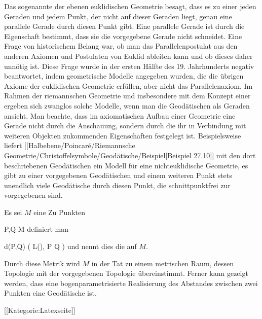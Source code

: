{}
{

Das sogenannte  {}
 {} {}
der ebenen euklidischen Geometrie besagt, dass es zu einer jeden Geraden und jedem Punkt, der nicht auf dieser Geraden liegt, genau eine parallele Gerade durch diesen Punkt gibt. Eine parallele Gerade ist durch die Eigenschaft bestimmt, dass sie die vorgegebene Gerade nicht schneidet. Eine Frage von historischem Belang war, ob man das Parallelenpostulat aus den anderen Axiomen und Postulaten von Euklid ableiten kann und ob dieses daher unnötig ist. Diese Frage wurde in der ersten Hälfte des 19. Jahrhunderts negativ beantwortet, indem geometrische Modelle
 {} {}
angegeben wurden, die die übrigen Axiome der euklidischen Geometrie erfüllen, aber nicht das Parallelenaxiom. Im Rahmen der riemannschen Geometrie und insbesondere mit dem Konzept einer
ergeben sich zwanglos solche Modelle, wenn man die Geodätischen
 {} {}
als Geraden ansieht. Man beachte, dass im axiomatischen Aufbau einer Geometrie eine Gerade nicht durch die Anschauung, sondern durch die ihr in Verbindung mit weiteren Objekten zukommenden Eigenschaften festgelegt ist. Beispielsweise liefert
[[Halbebene/Poincaré/Riemannsche Geometrie/Christoffelsymbole/Geodätische/Beispiel|Beispiel 27.10]]
mit den dort beschriebenen Geodätischen ein Modell für eine nichteuklidische Geometrie, es gibt zu einer vorgegebenen Geodätischen und einem weiteren Punkt stets unendlich viele Geodätische durch diesen Punkt, die schnittpunktfrei zur vorgegebenen sind.

}

{}
{

Es sei $M$ eine
Zu Punkten

\mavergleichskette
{\vergleichskette
{ P,Q
}
{ \in }{ M
}
{  }{
}
{    }{
}
{   }{
}
}
{}{}{}
definiert man

\mavergleichskettedisp
{\vergleichskette
{ d(P,Q)
}
{ } {  ( L(\gamma), \gamma {} P  Q  )
}
{ } {
}
{ } {
}
{ } {
}
}
{}{}{}
und nennt dies die
auf $M$.

}

Durch diese Metrik wird $M$ in der Tat zu einem metrischen Raum, dessen Topologie mit der vorgegebenen Topologie übereinstimmt. Ferner kann gezeigt werden, dass eine bogenparametrisierte Realisierung des Abstandes zwischen zwei Punkten eine Geodätische ist.

 [[Kategorie:Latexseite]]
